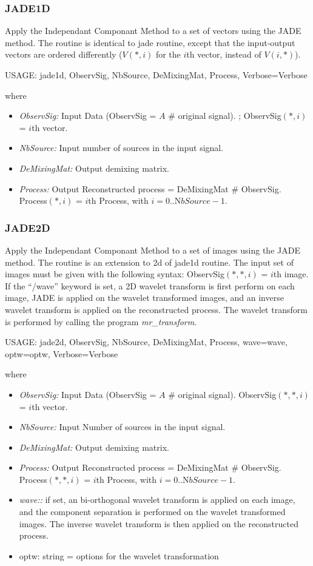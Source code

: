\subsubsection{JADE1D}
Apply the Independant Componant Method to a set of vectors using
the JADE method. The routine is identical to jade routine, except
that the input-output vectors are ordered differently ($V(*,i)$ for
the $i$th vector, instead of $V(i,*)$).
{\bf
\begin{center}
 USAGE:  jade1d, ObservSig, NbSource, DeMixingMat, Process, Verbose=Verbose
\end{center}}
where
\begin{itemize}
\item {\em  ObservSig:} Input Data (ObservSig = $A$ \# original signal).
;                    ObservSig$(*,i)$ = $i$th vector.
\item {\em  NbSource:}  Input number of sources in the input signal.
\item {\em DeMixingMat:} Output demixing matrix.
\item {\em Process:} Output Reconstructed process = DeMixingMat \# ObservSig.
Process$(*, i)$ = $i$th Process, with $i = 0.. {\mathrm NbSource} - 1$.
\end{itemize}

\subsubsection{JADE2D}
Apply the Independant Componant Method to a set of images using
the JADE method. The routine is an extension to 2d of jade1d routine.
The input set of images must be given with the following syntax:
ObservSig$(*, *, i)$ = $i$th image. If the ``/wave'' keyword is set,
a 2D wavelet transform is first perform on each image, JADE is applied
on the wavelet transformed images, and an inverse wavelet transform
is applied on the reconstructed process. The wavelet transform is
performed by calling the program {\em mr\_transform}. 
{\bf
\begin{center}
 USAGE: jade2d, ObservSig, NbSource, DeMixingMat, Process, wave=wave, optw=optw, Verbose=Verbose
\end{center}}
where
\begin{itemize}
\item {\em  ObservSig:} Input Data (ObservSig = $A$ \# original signal).
ObservSig$(*,*,i)$ = $i$th vector.
\item {\em  NbSource:}  Input Number of sources in the input signal.
\item {\em DeMixingMat:} Output demixing matrix.
\item {\em Process:} Output Reconstructed process = DeMixingMat \# ObservSig.
Process$(*, *, i)$ = $i$th Process, with $i = 0.. {\mathrm NbSource} - 1$.
\item {\em wave::} if set, an bi-orthogonal wavelet transform is applied
on each image, and the component separation is performed
on the wavelet transformed images.
The inverse wavelet transform is then applied on the
reconstructed process.
\item {optw:} string = options for the wavelet transformation
\end{itemize}

